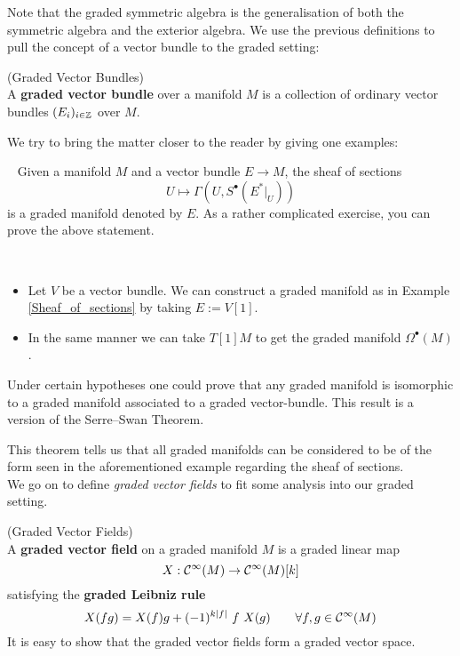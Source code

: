 Note that the graded symmetric algebra is the generalisation of both the symmetric algebra and the exterior algebra. We use the previous definitions to pull the concept of a vector bundle to the graded setting:

\begin{definition} (Graded Vector Bundles)\\
  A \textbf{graded vector bundle} over a manifold $M$ is a collection of ordinary vector bundles $(E_i)_{i\in \mathbb{Z}}$ over $M$.
\end{definition}

We try to bring the matter closer to the reader by giving one examples:

\begin{example}~
\label{Sheaf_of_sections}
  Given a manifold $M$ and a vector bundle $E\longrightarrow M$, the sheaf of sections
  $$ U \mapsto \Gamma(U, S^\bullet(E^*|_U)) $$
  is a graded manifold denoted by $E$. As a rather complicated exercise, you can prove the above statement.
\end{example}

\begin{example}~
\begin{itemize}
  \item Let $V$ be a vector bundle. We can construct a graded manifold as in Example \ref{Sheaf_of_sections} by taking $E:= V[1]$.

  \item In the same manner we can take $T[1]M$ to get the graded manifold $\Omega^\bullet(M)$.
\end{itemize}
\end{example}

\begin{rem} Under certain hypotheses one could prove that any graded manifold is isomorphic to a graded manifold associated to a graded vector-bundle. This result is a version of the Serre--Swan Theorem. 
\end{rem}


This theorem tells us that all graded manifolds can be considered to be of the form seen in the aforementioned example regarding the sheaf of sections.\\

We go on to define \emph{graded vector fields} to fit some analysis into our graded setting.

\begin{definition} (Graded Vector Fields)\\
  A \textbf{graded vector field} on a graded manifold $M$ is a graded linear map
  $$ X:\mathcal{C}^{\infty}(M) \rightarrow \mathcal{C}^{\infty}(M)[k] $$
  satisfying the \textbf{graded Leibniz rule}
  $$ X(fg) = X(f) g + (-1)^{k|f|} \ f \ X(g) \quad \quad \forall f,g \in \mathcal{C}^{\infty}(M)$$
  It is easy to show that the graded vector fields form a graded vector space.
\end{definition}

